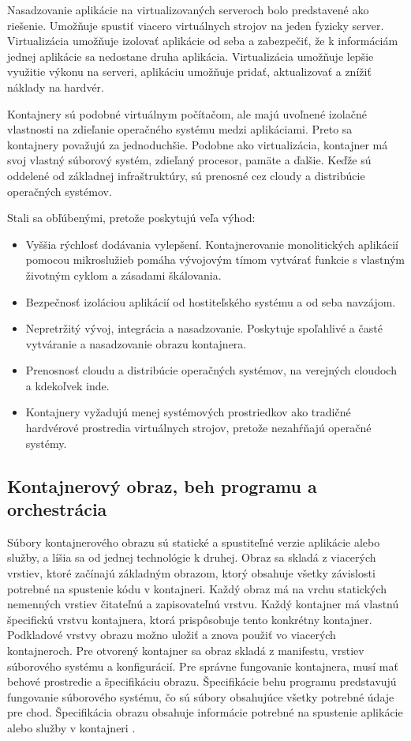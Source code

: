 Nasadzovanie aplikácie na virtualizovaných serveroch bolo predstavené ako riešenie. Umožňuje spustiť viacero virtuálnych strojov na jeden fyzicky server. Virtualizácia umožňuje izolovať aplikácie od seba a zabezpečiť, že k informáciám jednej aplikácie sa nedostane druha aplikácia. Virtualizácia umožňuje lepšie využitie výkonu na serveri, aplikáciu umožňuje pridať, aktualizovať a znížiť náklady na hardvér.

Kontajnery sú podobné virtuálnym počítačom, ale majú uvoľnené izolačné vlastnosti na zdieľanie operačného systému medzi aplikáciami. Preto sa kontajnery považujú za jednoduchšie. Podobne ako virtualizácia, kontajner má svoj vlastný súborový systém, zdieľaný procesor, pamäte a ďalšie. Keďže sú oddelené od základnej infraštruktúry, sú prenosné cez cloudy a distribúcie operačných systémov.

Stali sa obľúbenými, pretože poskytujú veľa výhod:

\begin{itemize}
    \item Vyššia rýchlosť dodávania vylepšení. Kontajnerovanie monolitických aplikácií pomocou mikroslužieb pomáha vývojovým tímom vytvárať funkcie s vlastným životným cyklom a zásadami škálovania.
	\item Bezpečnosť izoláciou aplikácií od hostiteľského systému a od seba navzájom.
	\item Nepretržitý vývoj, integrácia a nasadzovanie. Poskytuje spoľahlivé a časté vytváranie a nasadzovanie obrazu kontajnera.
	\item Prenosnosť cloudu a distribúcie operačných systémov, na verejných cloudoch a kdekoľvek inde.
	\item Kontajnery vyžadujú menej systémových prostriedkov ako tradičné hardvérové prostredia virtuálnych strojov, pretože nezahŕňajú operačné systémy.
\end{itemize}

\subsection{Kontajnerový obraz, beh programu a orchestrácia}

Súbory kontajnerového obrazu sú statické a spustiteľné verzie aplikácie alebo služby, a líšia sa od jednej technológie k druhej. Obraz sa skladá z viacerých vrstiev, ktoré začínajú základným obrazom, ktorý obsahuje všetky závislosti potrebné na spustenie kódu v kontajneri. Každý obraz má na vrchu statických nemenných vrstiev čitateľnú a zapisovateľnú vrstvu. Každý kontajner má vlastnú špecifickú vrstvu kontajnera, ktorá prispôsobuje tento konkrétny kontajner. Podkladové vrstvy obrazu možno uložiť a znova použiť vo viacerých kontajneroch. Pre otvorený kontajner sa obraz skladá z manifestu, vrstiev súborového systému a konfigurácií. Pre správne fungovanie kontajnera, musí mať behové prostredie a špecifikáciu obrazu. Špecifikácie behu programu predstavujú fungovanie súborového systému, čo sú súbory obsahujúce všetky potrebné údaje pre chod. Špecifikácia obrazu obsahuje informácie potrebné na spustenie aplikácie alebo služby v kontajneri \cite{orchestrate}.

